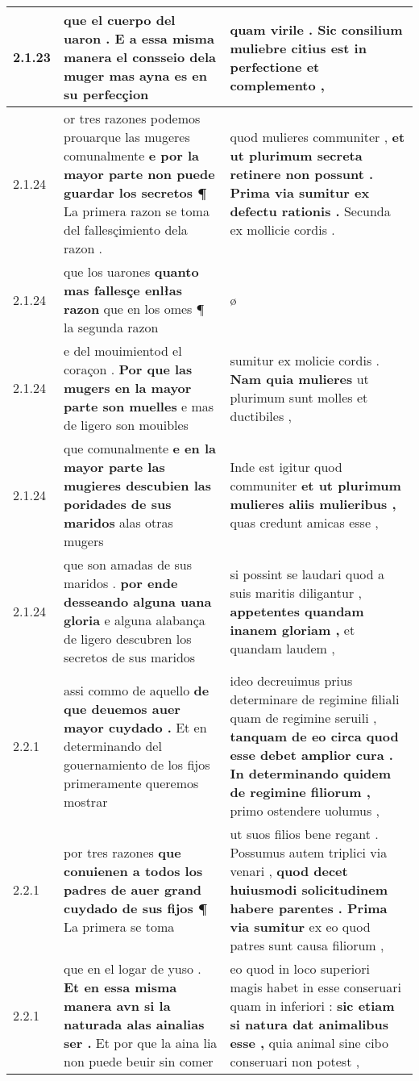 \begin{tabular}{|p{1cm}|p{6.5cm}|p{6.5cm}|}
2.1.23 & que el cuerpo del uaron . \textbf{ E a essa misma manera el consseio dela muger } mas ayna es en su perfecçion & quam virile . \textbf{ Sic consilium muliebre citius est in perfectione } et complemento , \\\hline
2.1.24 & or tres razones podemos prouarque las mugeres comunalmente \textbf{ e por la mayor parte non puede guardar los secretos ¶ } La primera razon se toma del fallesçimiento dela razon . & quod mulieres communiter , \textbf{ et ut plurimum secreta retinere non possunt . Prima via sumitur ex defectu rationis . } Secunda ex mollicie cordis . \\\hline
2.1.24 & que los uarones \textbf{ quanto mas fallesçe enlłas razon } que en los omes ¶ la segunda razon & ø \\\hline
2.1.24 & e del mouimientod el coraçon . \textbf{ Por que las mugers en la mayor parte son muelles } e mas de ligero son mouibles & sumitur ex molicie cordis . \textbf{ Nam quia mulieres } ut plurimum sunt molles et ductibiles , \\\hline
2.1.24 & que comunalmente \textbf{ e en la mayor parte las mugieres descubien las poridades de sus maridos } alas otras mugers & Inde est igitur quod communiter \textbf{ et ut plurimum mulieres aliis mulieribus , } quas credunt amicas esse , \\\hline
2.1.24 & que son amadas de sus maridos . \textbf{ por ende desseando alguna uana gloria } e alguna alabança de ligero descubren los secretos de sus maridos & si possint se laudari quod a suis maritis diligantur , \textbf{ appetentes quandam inanem gloriam , } et quandam laudem , \\\hline
2.2.1 & assi commo de aquello \textbf{ de que deuemos auer mayor cuydado . } Et en determinando del gouernamiento de los fijos primeramente queremos mostrar & ideo decreuimus prius determinare de regimine filiali quam de regimine seruili , \textbf{ tanquam de eo circa quod esse debet amplior cura . In determinando quidem de regimine filiorum , } primo ostendere uolumus , \\\hline
2.2.1 & por tres razones \textbf{ que conuienen a todos los padres de auer grand cuydado de sus fijos ¶ } La primera se toma & ut suos filios bene regant . Possumus autem triplici via venari , \textbf{ quod decet huiusmodi solicitudinem habere parentes . Prima via sumitur } ex eo quod patres sunt causa filiorum , \\\hline
2.2.1 & que en el logar de yuso . \textbf{ Et en essa misma manera avn si la naturada alas ainalias ser . } Et por que la aina lia non puede beuir sin comer & eo quod in loco superiori magis habet in esse conseruari quam in inferiori : \textbf{ sic etiam si natura dat animalibus esse , } quia animal sine cibo conseruari non potest , \\\hline

\end{tabular}
